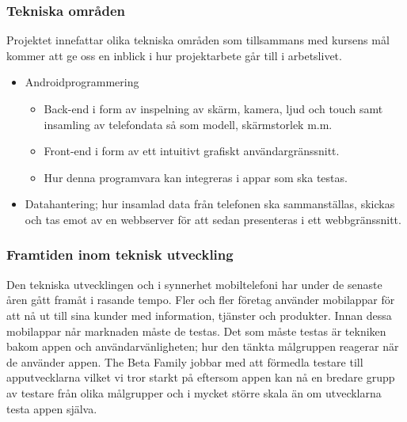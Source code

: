 \subsubsection{Tekniska områden}

Projektet innefattar olika tekniska områden som tillsammans med kursens mål kommer att ge oss en inblick i hur projektarbete går till i arbetslivet. 
\begin{itemize}
	\item Androidprogrammering
	\begin{itemize}
		\item Back-end i form av inspelning av skärm, kamera, ljud och touch samt insamling av telefondata så som modell, skärmstorlek m.m.
		\item Front-end i form av ett intuitivt grafiskt användargränssnitt.
		\item Hur denna programvara kan integreras i appar som ska testas.
	\end{itemize}
	\item Datahantering; hur insamlad data från telefonen ska sammanställas, skickas och tas emot av en webbserver för att sedan presenteras i ett webbgränssnitt.
\end{itemize}

\subsubsection{Framtiden inom teknisk utveckling}
Den tekniska utvecklingen och i synnerhet mobiltelefoni har under de senaste åren gått framåt i rasande tempo. Fler och fler företag använder mobilappar för att nå ut till sina kunder med information, tjänster och produkter. Innan dessa mobilappar når marknaden måste de testas. Det som måste testas är tekniken bakom appen och användarvänligheten; hur den tänkta målgruppen reagerar när de använder appen. The Beta Family jobbar med att förmedla testare till apputvecklarna vilket vi tror starkt på eftersom appen kan nå en bredare grupp av testare från olika målgrupper och i mycket större skala än om utvecklarna testa appen själva.
